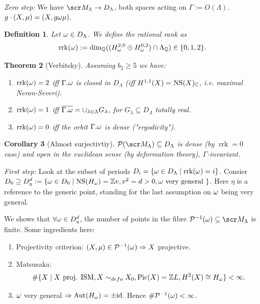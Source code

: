 \documentclass[A4paper, british]{amsart}
\theoremstyle{darkgreentheorem}
\newtheorem{thm}{Theorem}[section]
\newtheorem{cor}[thm]{Corollary}
\theoremstyle{darkbluedefinition}
\newtheorem{defn}[thm]{Definition}
\theoremstyle{darkredexample}
\theoremstyle{remark}
\DeclareMathOperator{\Pic}{Pic}
\DeclareMathOperator{\Aut}{Aut}
\newcommand{\1}{\mathbbm{1}}
\newcommand{\op}{\oplus}
\newcommand{\id}{\mathrm{id}}
\newcommand{\sub}{\subseteq}
\begin{document}
\textit{Zero step:}
We have $\M_{\Lambda}\to D_{\Lambda}$, both spaces acting on $\Gamma:=O(\Lambda)$.
$g\cdot (X,\mu)=(X,g\omega \mu)$.

\begin{defn}
    Let $\omega\in D_{\Lambda}$.
    We define the \textit{rational rank} as
    \[ \operatorname{rrk}(\w):=\dim_{\Q}((H^{2,0}_{\w}\op H^{0,2}_{\w})\cap \Lambda_{\Q})\in \{0,1,2\}. \]
\end{defn}

\begin{thm}[Verbitsky]
    Assuming $b_{2}\geqslant 5$ we have:
    \begin{enumerate}
	\item $\operatorname{rrk}(\omega)=2$ iff $\Gamma .\omega$ is closed in $D_{\Lambda}$ (iff $H^{1,1}(X)=\operatorname{NS}(X)_{\mathbb{C}}$, i.e. maximal Neron-Severi).
	\item $\operatorname{rrk}(\omega)=1$ iff $\overline{\Gamma .\omega}=\cup_{\lambda\in \Lambda}G_{\lambda}$, for $G_{\lambda}\sub D_{\Lambda}$ totally real.
	\item $\operatorname{rrk}(\omega)=0$ iff the orbit $\Gamma .\omega$ is dense ("ergodicity").
    \end{enumerate}
\end{thm}

\begin{cor}[Almost surjectivtiy]
    $\calP(\M_{\Lambda})\sub D_{\Lambda}$ is dense (by $\operatorname{rrk}=0$ case) and open in the euclidean sense (by deformation theory), $\Gamma$-invariant.
\end{cor}

\textit{First step:}
Look at the subset of periods $D_{i}=\{\omega\in D_{\Lambda}\mid \operatorname{rrk}(\omega)=i \}$.
Consier $D_{0}\supseteq D_{\eta}^{d}:=\{ \omega\in D_{0}\mid \operatorname{NS}(H_{\omega})=\mathbb{Z} v, v^{2}=d>0, \omega \text{ very general }\}$.
Here $\eta$ is a reference to the generic point, standing for the last assumption on $\omega$ being very general.

We shows that $\forall \omega\in D_{\eta}^{d}$, the number of points in the fibre $\calP^{-1}(\w)\sub \M_{\Lambda}$ is finite.
Some ingredients here:
\begin{enumerate}
    \item Projectivity criterion: $(X,\mu)\in \mathcal{P}^{-1}(\omega)\Rightarrow X$ projective.
    \item Matsusaka:
	\[ \# \{ X\mid X \text{ proj. ISM}, X\sim_{defo}X_{0},\Pic(X)=\Z L, H^{2}(X)\cong H_{\w}\} < \infty. \]
    \item $\omega$ very general $\Rightarrow \Aut(H_{\w})=\pm \id$.
	Hence $\# \mathcal{P}^{-1}(\omega) < \infty$.
\end{enumerate}
\end{document}
